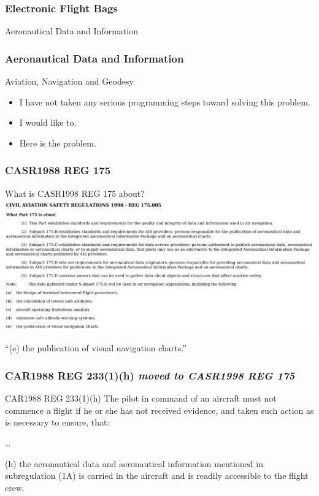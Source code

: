 \begin{frame}
\frametitle{Electronic Flight Bags}
\begin{center}
Aeronautical Data and Information
\end{center}
\end{frame}

\begin{frame}
\frametitle{Aeronautical Data and Information}
\begin{block}{Aviation, Navigation and Geodesy}
\begin{itemize}
\item<1-> I have not taken any serious programming steps toward solving this problem.
\item<2-> I would like to.
\item<3-> Here is the problem.
\end{itemize}
\end{block}
\end{frame}

\begin{frame}
\frametitle{CASR1988 REG 175}
\begin{block}{What is CASR1998 REG 175 about?}
\includegraphics[height=0.5\textheight]{image/casr175_005.png}
\end{block}
\par
``(e) the publication of visual navigation charts.''
\end{frame}

\begin{frame}
\frametitle{CAR1988 REG 233(1)(h) \emph{moved to CASR1998 REG 175}}
\scriptsize
\begin{block}{CAR1988 REG 233(1)(h)}
The pilot in command of an aircraft must not commence a flight if he or she has not received evidence, and taken such action as is necessary to ensure, that:
\par
\ldots
\par
(h)  the aeronautical data and aeronautical information mentioned in subregulation (1A) is carried in the aircraft and is readily accessible to the flight crew.
\end{block}
\par
\end{frame}

